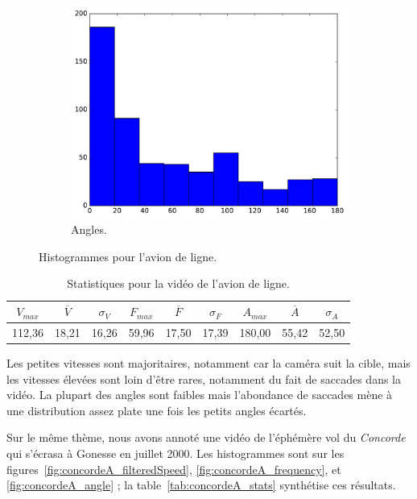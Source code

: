 \begin{figure}[!htbp]
\begin{subfigure}[t]{\subImgWclicks}
			\centering
			\includegraphics[width=\textwidth]{figures/ch3/chinaA_angle}
			\caption{Angles.}
			\label{fig:chinaA_angle}
		\end{subfigure}
		\caption[Histogrammes pour l'avion de ligne]{Histogrammes pour l'avion de ligne.}
		\label{fig:histChina}
	\end{figure}
	
\begin{table}
	\centering
	\begin{tabular}{c c c c c c c c c}
		$V_{max}$	& $\overline{V}$	& $\sigma_{V}$	& $F_{max}$	& $\overline{F}$	& $\sigma_{F}$	& $A_{max}$	& $\overline{A}$	& $\sigma_{A}$	\bigstrut[b] \\ \hline

		112,36		& 18,21				& 16,26			& 59,96		& 17,50				& 17,39			& 180,00	& 55,42				& 52,50			\bigstrut[t] \\
	\end{tabular}
	\caption[Statistiques pour la vidéo de l'avion de ligne]{Statistiques pour la vidéo de l'avion de ligne.}
	\label{tab:chinaA_stats}
\end{table}

	Les petites vitesses sont majoritaires, notamment car la caméra suit la cible, mais les vitesses élevées sont loin d'être rares, notamment du fait de saccades dans la vidéo. La plupart des angles sont faibles mais l'abondance de saccades mène à une distribution assez \og plate \fg{} une fois les petits angles écartés.

	Sur le même thème, nous avons annoté une vidéo de l'éphémère vol du \emph{Concorde} qui s'écrasa à Gonesse en juillet 2000\footnotemark{}. Les histogrammes sont sur les figures~\ref{fig:concordeA_filteredSpeed}, \ref{fig:concordeA_frequency}, et \ref{fig:concordeA_angle} ; la table~\ref{tab:concordeA_stats} synthétise ces résultats.
		
